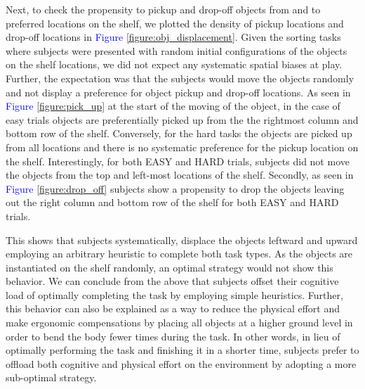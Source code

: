 Next, to check the propensity to pickup and drop-off objects from and to preferred locations on the shelf, we plotted the density of pickup locations and drop-off locations in \textcolor{Blue}{Figure \ref{figure:obj_displacement}}. Given the sorting tasks where subjects were presented with random initial configurations of the objects on the shelf locations, we did not expect any systematic spatial biases at play. Further, the expectation was that the subjects would move the objects randomly and not display a preference for object pickup and drop-off locations. As seen in \textcolor{Blue}{Figure \ref{figure:pick_up}} at the start of the moving of the object, in the case of easy trials objects are preferentially picked up from the the rightmost column and bottom row of the shelf. Conversely, for the hard tasks the objects are picked up from all locations and there is no systematic preference for the pickup location on the shelf. Interestingly, for both EASY and HARD trials, subjects did not move the objects from the top and left-most locations of the shelf. Secondly, as seen in  \textcolor{Blue}{Figure \ref{figure:drop_off}} subjects show a propensity to drop the objects leaving out the right column and bottom row of the shelf for both EASY and HARD trials. 

This shows that subjects systematically, displace the objects leftward and upward employing an arbitrary heuristic to complete both task types. As the objects are instantiated on the shelf randomly, an optimal strategy would not show this behavior. We can conclude from the above that subjects offset their cognitive load of optimally completing the task by employing simple heuristics. Further, this behavior can also be explained as a way to reduce the physical effort and make ergonomic compensations by placing all objects at a higher ground level in order to bend the body fewer times during the task. In other words, in lieu of optimally performing the task and finishing it in a shorter time, subjects prefer to offload both cognitive and physical effort on the environment by adopting a more sub-optimal strategy.

